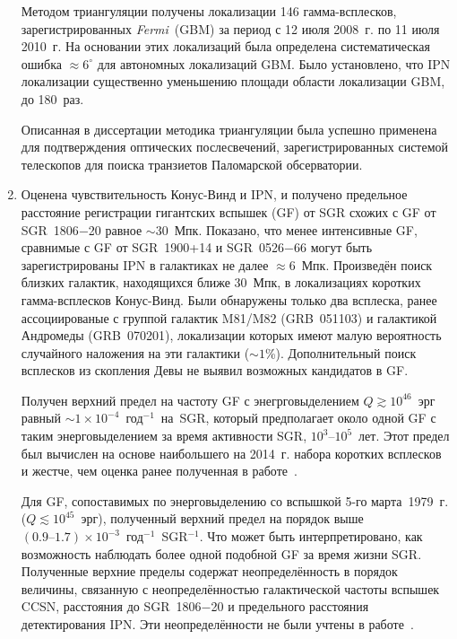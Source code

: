 \begin{enumerate}
    Методом триангуляции получены локализации 146 гамма-всплесков,
    зарегистрированных \textit{Fermi}~(GBM) за период с 12 июля 2008~г. по 11 июля 2010~г.
    На основании этих локализаций была определена систематическая ошибка $\approx 6^\circ$
    для автономных локализаций GBM. Было установлено, что IPN локализации 
    существенно уменьшению площади области локализации GBM, до 180~раз.  

    Описанная в диссертации методика триангуляции была успешно применена для 
    подтверждения оптических послесвечений, зарегистрированных системой телескопов 
    для поиска транзиетов Паломарской обсерватории.
    
\item Оценена чувствительность Конус-Винд и IPN, и получено 
    предельное расстояние регистрации гигантских вспышек (GF) от SGR схожих с GF от SGR~1806$-$20 
    равное $\sim 30$~Мпк. Показано, что менее интенсивные GF, сравнимые 
    с GF от SGR~1900+14 и SGR~0526$-$66 могут быть зарегистрированы IPN в галактиках 
    не далее $\approx 6$~Мпк.
    Произведён поиск близких галактик, находящихся ближе 30~Мпк, в локализациях 
    коротких гамма-всплесков Конус-Винд. Были обнаружены только два всплеска, ранее 
    ассоциированые с группой галактик M81/M82 (GRB~051103) и галактикой Андромеды (GRB~070201),
    локализации которых имеют малую вероятность случайного наложения на эти галактики ($\sim 1$\%).
    Дополнительный поиск всплесков из скопления Девы не выявил возможных кандидатов в GF.
    
    Получен верхний предел на частоту GF с энегрговыделением $Q \gtrsim 10^{46}$~эрг равный
    $\sim 1 \times 10^{-4}$~год$^{-1}$~на~SGR, который предполагает 
    около одной GF с таким энерговыделением за время активности SGR, $10^3\textrm{--}10^5$~лет. 
    Этот предел был вычислен на основе наибольшего на 2014~г.  
    набора коротких всплесков и жестче, чем оценка ранее полученная в работе~\citep{Ofek_2007ApJ}.
    
    Для GF, сопоставимых по энерговыделению со вспышкой 5-го марта~1979~г. ($Q \lesssim 10^{45}$~эрг), 
    полученный верхний предел на порядок выше $(0.9\textrm{--}1.7)\times 10^{-3}$~год$^{-1}$~SGR$^{-1}$. 
    Что может быть интерпретировано, как возможность наблюдать более одной подобной GF за время жизни SGR.
    Полученные верхние пределы содержат неопределённость в порядок величины, связанную с
    неопределённостью галактической частоты вспышек CCSN, расстояния до SGR~1806$-$20 и
    предельного расстояния детектирования IPN. Эти неопределённости не были учтены в работе~\citep{Ofek_2007ApJ}.
    

\end{enumerate}
